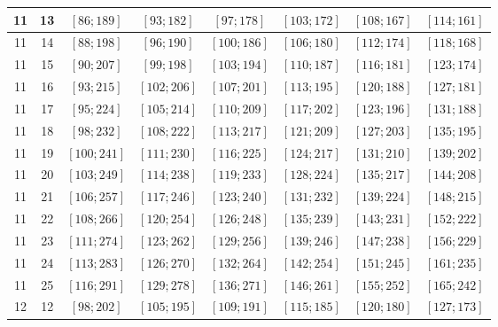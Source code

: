 \documentclass[a4paper,12pt]{article}
\begin{document}
\begin{center}
{\begin{longtable}[H]{|c|c|c|c|c|c|c|c|}
11 &  13 &  $\left[ 86; 189\right]$ &  $\left[ 93; 182\right]$ &  $\left[ 97; 178\right]$ &  $\left[ 103; 172\right]$ &  $\left[ 108; 167\right]$ &  $\left[ 114; 161\right]$ \tabularnewline \hline
11 &  14 &  $\left[ 88; 198\right]$ &  $\left[ 96; 190\right]$ &  $\left[ 100; 186\right]$ &  $\left[ 106; 180\right]$ &  $\left[ 112; 174\right]$ &  $\left[ 118; 168\right]$ \tabularnewline \hline
11 &  15 &  $\left[ 90; 207\right]$ &  $\left[ 99; 198\right]$ &  $\left[ 103; 194\right]$ &  $\left[ 110; 187\right]$ &  $\left[ 116; 181\right]$ &  $\left[ 123; 174\right]$ \tabularnewline \hline
11 &  16 &  $\left[ 93; 215\right]$ &  $\left[ 102; 206\right]$ &  $\left[ 107; 201\right]$ &  $\left[ 113; 195\right]$ &  $\left[ 120; 188\right]$ &  $\left[ 127; 181\right]$ \tabularnewline \hline
11 &  17 &  $\left[ 95; 224\right]$ &  $\left[ 105; 214\right]$ &  $\left[ 110; 209\right]$ &  $\left[ 117; 202\right]$ &  $\left[ 123; 196\right]$ &  $\left[ 131; 188\right]$ \tabularnewline \hline
11 &  18 &  $\left[ 98; 232\right]$ &  $\left[ 108; 222\right]$ &  $\left[ 113; 217\right]$ &  $\left[ 121; 209\right]$ &  $\left[ 127; 203\right]$ &  $\left[ 135; 195\right]$ \tabularnewline \hline
11 &  19 &  $\left[ 100; 241\right]$ &  $\left[ 111; 230\right]$ &  $\left[ 116; 225\right]$ &  $\left[ 124; 217\right]$ &  $\left[ 131; 210\right]$ &  $\left[ 139; 202\right]$ \tabularnewline \hline
11 &  20 &  $\left[ 103; 249\right]$ &  $\left[ 114; 238\right]$ &  $\left[ 119; 233\right]$ &  $\left[ 128; 224\right]$ &  $\left[ 135; 217\right]$ &  $\left[ 144; 208\right]$ \tabularnewline \hline
11 &  21 &  $\left[ 106; 257\right]$ &  $\left[ 117; 246\right]$ &  $\left[ 123; 240\right]$ &  $\left[ 131; 232\right]$ &  $\left[ 139; 224\right]$ &  $\left[ 148; 215\right]$ \tabularnewline \hline
11 &  22 &  $\left[ 108; 266\right]$ &  $\left[ 120; 254\right]$ &  $\left[ 126; 248\right]$ &  $\left[ 135; 239\right]$ &  $\left[ 143; 231\right]$ &  $\left[ 152; 222\right]$ \tabularnewline \hline
11 &  23 &  $\left[ 111; 274\right]$ &  $\left[ 123; 262\right]$ &  $\left[ 129; 256\right]$ &  $\left[ 139; 246\right]$ &  $\left[ 147; 238\right]$ &  $\left[ 156; 229\right]$ \tabularnewline \hline
11 &  24 &  $\left[ 113; 283\right]$ &  $\left[ 126; 270\right]$ &  $\left[ 132; 264\right]$ &  $\left[ 142; 254\right]$ &  $\left[ 151; 245\right]$ &  $\left[ 161; 235\right]$ \tabularnewline \hline
11 &  25 &  $\left[ 116; 291\right]$ &  $\left[ 129; 278\right]$ &  $\left[ 136; 271\right]$ &  $\left[ 146; 261\right]$ &  $\left[ 155; 252\right]$ &  $\left[ 165; 242\right]$ \tabularnewline \hline
12 &  12 &  $\left[ 98; 202\right]$ &  $\left[ 105; 195\right]$ &  $\left[ 109; 191\right]$ &  $\left[ 115; 185\right]$ &  $\left[ 120; 180\right]$ &  $\left[ 127; 173\right]$ \tabularnewline \hline

\end{longtable}}
\end{center}
\end{document}

